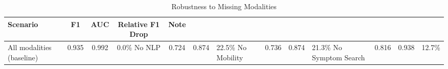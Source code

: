 \begin{table}[h]
\centering
\caption{Robustness to Missing Modalities}
\label{tab:missing_modality}
\begin{tabular}{lcccc}
\hline
Scenario & F1 & AUC & Relative F1 Drop & Note \\
\hline
All modalities (baseline) & 0.935 & 0.992 & 0.0\%%
No NLP & 0.724 & 0.874 & 22.5\%%
No Mobility & 0.736 & 0.874 & 21.3\%%
No Symptom Search & 0.816 & 0.938 & 12.7\%%
\hline
\end{tabular}
\end{table}
